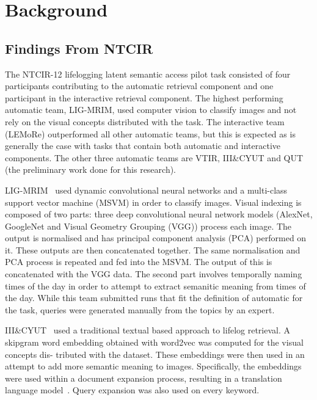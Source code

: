 \chapter{Background}



\section{Findings From NTCIR}
The NTCIR-12 lifelogging latent semantic access pilot task consisted of four participants contributing to the automatic retrieval component and one participant in the interactive retrieval component. The highest performing automatic team, LIG-MRIM, used computer vision to classify images and not rely on the visual concepts distributed with the task. The interactive team (LEMoRe) outperformed all other automatic teams, but this is expected as is generally the case with tasks that contain both automatic and interactive components. The other three automatic teams are VTIR, III\&CYUT and QUT (the preliminary work done for this research).

LIG-MRIM~\cite{safadilig2016ligmrim} used dynamic convolutional neural networks and a multi-class support vector machine (MSVM) in order to classify images. Visual indexing is composed of two parts: three deep convolutional neural network models (AlexNet, GoogleNet and Visual Geometry Grouping (VGG)) process each image. The output is normalised and has principal component analysis (PCA) performed on it. These outputs are then concatenated together. The same normalisation and PCA process is repeated and fed into the MSVM. The output of this is concatenated with the VGG data. The second part involves temporally naming times of the day in order to attempt to extract semanitic meaning from times of the day. While this team submitted runs that fit the definition of automatic for the task, queries were generated manually from the topics by an expert.

III\&CYUT~\cite{lin2016image} used a traditional textual based approach to lifelog retrieval. A skipgram word embedding obtained with word2vec\cite{mikolov2013word2vec} was computed for the visual concepts dis- tributed with the dataset. These embeddings were then used in an attempt to add more semantic meaning to images. Specifically, the embeddings were used within a document expansion process, resulting in a translation language model~\cite{zuccon2015integrating}. Query expansion was also used on every keyword.

